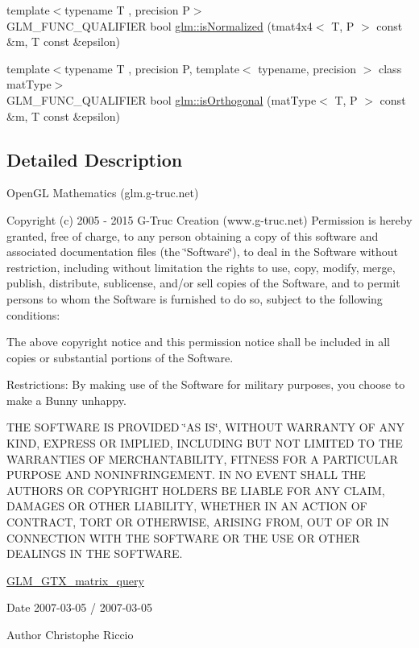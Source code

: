 \begin{DoxyCompactItemize}
\item 
{\footnotesize template$<$typename T , precision P$>$ }\\G\-L\-M\-\_\-\-F\-U\-N\-C\-\_\-\-Q\-U\-A\-L\-I\-F\-I\-E\-R bool \hyperlink{group__gtx__matrix__query_ga934b673ec0e16d79eca0ca9dbb5d6d8b}{glm\-::is\-Normalized} (tmat4x4$<$ T, P $>$ const \&m, T const \&epsilon)
\item 
{\footnotesize template$<$typename T , precision P, template$<$ typename, precision $>$ class mat\-Type$>$ }\\G\-L\-M\-\_\-\-F\-U\-N\-C\-\_\-\-Q\-U\-A\-L\-I\-F\-I\-E\-R bool \hyperlink{group__gtx__matrix__query_gab2cb5d23df77b4e4e63ad2965acd31b3}{glm\-::is\-Orthogonal} (mat\-Type$<$ T, P $>$ const \&m, T const \&epsilon)
\end{DoxyCompactItemize}


\subsection{Detailed Description}
Open\-G\-L Mathematics (glm.\-g-\/truc.\-net)

Copyright (c) 2005 -\/ 2015 G-\/\-Truc Creation (www.\-g-\/truc.\-net) Permission is hereby granted, free of charge, to any person obtaining a copy of this software and associated documentation files (the \char`\"{}\-Software\char`\"{}), to deal in the Software without restriction, including without limitation the rights to use, copy, modify, merge, publish, distribute, sublicense, and/or sell copies of the Software, and to permit persons to whom the Software is furnished to do so, subject to the following conditions\-:

The above copyright notice and this permission notice shall be included in all copies or substantial portions of the Software.

Restrictions\-: By making use of the Software for military purposes, you choose to make a Bunny unhappy.

T\-H\-E S\-O\-F\-T\-W\-A\-R\-E I\-S P\-R\-O\-V\-I\-D\-E\-D \char`\"{}\-A\-S I\-S\char`\"{}, W\-I\-T\-H\-O\-U\-T W\-A\-R\-R\-A\-N\-T\-Y O\-F A\-N\-Y K\-I\-N\-D, E\-X\-P\-R\-E\-S\-S O\-R I\-M\-P\-L\-I\-E\-D, I\-N\-C\-L\-U\-D\-I\-N\-G B\-U\-T N\-O\-T L\-I\-M\-I\-T\-E\-D T\-O T\-H\-E W\-A\-R\-R\-A\-N\-T\-I\-E\-S O\-F M\-E\-R\-C\-H\-A\-N\-T\-A\-B\-I\-L\-I\-T\-Y, F\-I\-T\-N\-E\-S\-S F\-O\-R A P\-A\-R\-T\-I\-C\-U\-L\-A\-R P\-U\-R\-P\-O\-S\-E A\-N\-D N\-O\-N\-I\-N\-F\-R\-I\-N\-G\-E\-M\-E\-N\-T. I\-N N\-O E\-V\-E\-N\-T S\-H\-A\-L\-L T\-H\-E A\-U\-T\-H\-O\-R\-S O\-R C\-O\-P\-Y\-R\-I\-G\-H\-T H\-O\-L\-D\-E\-R\-S B\-E L\-I\-A\-B\-L\-E F\-O\-R A\-N\-Y C\-L\-A\-I\-M, D\-A\-M\-A\-G\-E\-S O\-R O\-T\-H\-E\-R L\-I\-A\-B\-I\-L\-I\-T\-Y, W\-H\-E\-T\-H\-E\-R I\-N A\-N A\-C\-T\-I\-O\-N O\-F C\-O\-N\-T\-R\-A\-C\-T, T\-O\-R\-T O\-R O\-T\-H\-E\-R\-W\-I\-S\-E, A\-R\-I\-S\-I\-N\-G F\-R\-O\-M, O\-U\-T O\-F O\-R I\-N C\-O\-N\-N\-E\-C\-T\-I\-O\-N W\-I\-T\-H T\-H\-E S\-O\-F\-T\-W\-A\-R\-E O\-R T\-H\-E U\-S\-E O\-R O\-T\-H\-E\-R D\-E\-A\-L\-I\-N\-G\-S I\-N T\-H\-E S\-O\-F\-T\-W\-A\-R\-E.

\hyperlink{group__gtx__matrix__query}{G\-L\-M\-\_\-\-G\-T\-X\-\_\-matrix\-\_\-query}

\begin{DoxyDate}{Date}
2007-\/03-\/05 / 2007-\/03-\/05 
\end{DoxyDate}
\begin{DoxyAuthor}{Author}
Christophe Riccio 
\end{DoxyAuthor}
